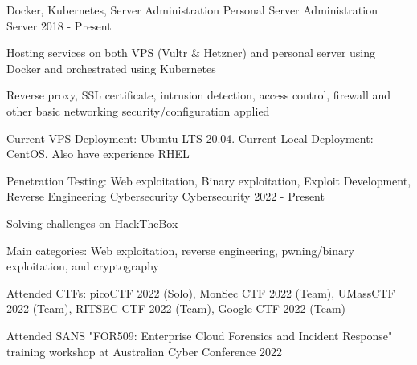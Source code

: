 

\begin{cventries}

  \cventry
    {Docker, Kubernetes, Server Administration}
    {Personal Server Administration}
    {Server}
    {2018 - Present}
    {
      \begin{cvitems}
        \item{Hosting services on both VPS (Vultr \& Hetzner) and personal server using Docker and orchestrated using Kubernetes}
        \item{Reverse proxy, SSL certificate, intrusion detection, access control, firewall and other basic networking security/configuration applied}
        \item{Current VPS Deployment: Ubuntu LTS 20.04. Current Local Deployment: CentOS. Also have experience RHEL}
      \end{cvitems}
    }



  \cventry
    {Penetration Testing: Web exploitation, Binary exploitation, Exploit Development, Reverse Engineering}
    {Cybersecurity}
    {Cybersecurity}
    {2022 - Present}
    {
      \begin{cvitems}
        \item{Solving challenges on HackTheBox}
        \item{Main categories: Web exploitation, reverse engineering, pwning/binary exploitation, and cryptography}
        \item{Attended CTFs: picoCTF 2022 (Solo), MonSec CTF 2022 (Team), UMassCTF 2022 (Team), RITSEC CTF 2022 (Team), Google CTF 2022 (Team)}
        \item{Attended SANS "FOR509: Enterprise Cloud Forensics and Incident Response" training workshop at Australian Cyber Conference 2022}
      \end{cvitems}
    }

\end{cventries}
